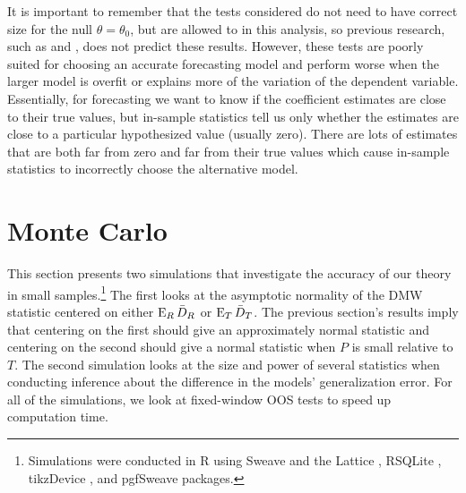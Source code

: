 \documentclass[11pt]{article}
\begin{document}
It is important to remember that the tests considered do not need to
have correct size for the null $\theta = \theta_0$, but are allowed to
in this analysis, so previous research, such as \citet{Cal:11c} and
\citet{Ana:12}, does not predict these results.  However, these tests
are poorly suited for choosing an accurate forecasting model and
perform worse when the larger model is overfit or explains more of the
variation of the dependent variable.  Essentially, for forecasting we
want to know if the coefficient estimates are close to their true
values, but in-sample statistics tell us only whether the estimates
are close to a particular hypothesized value (usually zero).  There
are lots of estimates that are both far from zero and far from their
true values which cause in-sample statistics to incorrectly choose the
alternative model.

\section{Monte Carlo}\label{sec:mc}
\newcommand{\thetanorm}{\ensuremath{\lvert \theta \rvert_2}} This
section presents two simulations that investigate the accuracy of our
theory in small samples.\footnote{Simulations were conducted in R
  \citep{Rde:10} using Sweave \citep{Lei:02} and the Lattice
  \citep{Sar:10}, RSQLite \citep{Jam:10}, tikzDevice
  \citep{ShB:11:0.6.1}, and pgfSweave \citep{BrS:11:1.2.1} packages.}
The first looks at the asymptotic normality of the DMW statistic
centered on either $\operatorname{E}_R \bar{D}_{R}$ or $\operatorname{E}_T \bar{D}_{T}$.  The previous
section's results imply that centering on the first should give an
approximately normal statistic and centering on the second should give
a normal statistic when $P$ is small relative to $T$.  The second
simulation looks at the size and power of several statistics when
conducting inference about the difference in the models'
generalization error.  For all of the simulations, we look at
fixed-window OOS tests to speed up computation time.
\end{document}
